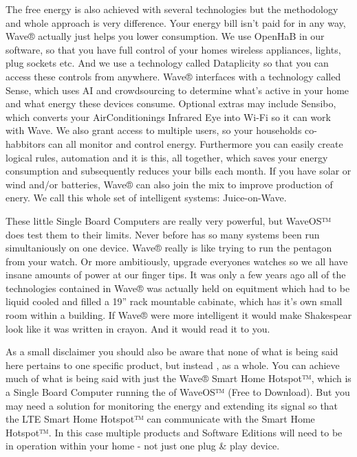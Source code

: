 \documentclass[letterpaper,10pt,openany,oneside,english]{sphinxmanual}
\begin{document}
The free energy is also achieved with several technologies but the methodology and whole approach is very difference. Your energy bill isn’t paid for in any way, Wave® actually just helps you lower consumption. We use OpenHaB in our software, so that you have full control of your homes wireless appliances, lights, plug sockets etc. And we use a technology called Dataplicity so that you can access these controls from anywhere. Wave® interfaces with a technology called Sense, which uses AI and crowdsourcing to determine what’s active in your home and what energy these devices consume. Optional extras may include Sensibo, which converts your AirConditionings Infrared Eye into Wi-Fi so it can work with Wave. We also grant access to multiple users, so your households co-habbitors can all monitor and control energy. Furthermore you can easily create logical rules, automation and it is this, all together, which saves your energy consumption and subsequently reduces your bills each month. If you have solar or wind and/or batteries, Wave® can also join the mix to improve production of enery.  We call this whole set of intelligent systems: Juice-on-Wave.

These little Single Board Computers are really very powerful, but WaveOS™ does test them to their limits. Never before has so many systems been run simultaniously on one device. Wave® really is like trying to run the pentagon from your watch. Or more ambitiously, upgrade everyones watches so we all have insane amounts of power at our finger tips. It was only a few years ago all of the technologies contained in Wave® was actually held on equitment which had to be liquid cooled and filled a 19” rack mountable cabinate, which has it’s own small room within a building. If Wave® were more intelligent it would make Shakespear look like it was written in crayon. And it would read it to you.

As a small disclaimer you should also be aware that none of what is being said here pertains to one specific product, but instead , as a whole. You can achieve much of what is being said with just the Wave® Smart Home Hotspot™, which is a Single Board Computer running the  of WaveOS™ (Free to Download). But you may need a solution for monitoring the energy and extending its signal so that the LTE Smart Home Hotspot™ can communicate with the Smart Home Hotspot™. In this case multiple products and Software Editions will need to be in operation within your home - not just one plug \& play device.
\end{document}
